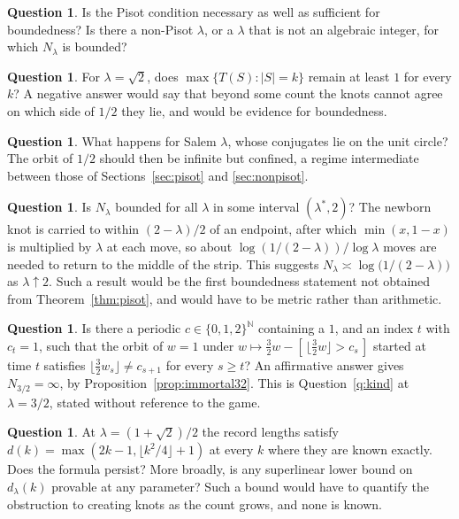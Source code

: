 \documentclass[11pt,reqno]{amsart}
\theoremstyle{plain}
\theoremstyle{definition}
\newtheorem{question}[theorem]{Question}
\theoremstyle{remark}
\begin{document}
\begin{question}
Is the Pisot condition necessary as well as sufficient for boundedness? Is
there a non-Pisot $\lambda$, or a $\lambda$ that is not an algebraic integer,
for which $N_\lambda$ is bounded?
\end{question}

\begin{question}
For $\lambda=\sqrt2$, does $\max\{T(S):|S|=k\}$ remain at least $1$ for every
$k$? A negative answer would say that beyond some count the knots cannot agree
on which side of $1/2$ they lie, and would be evidence for boundedness.
\end{question}

\begin{question}
What happens for Salem $\lambda$, whose conjugates lie on the unit circle? The
orbit of $1/2$ should then be infinite but confined, a regime intermediate
between those of Sections~\ref{sec:pisot} and \ref{sec:nonpisot}.
\end{question}

\begin{question}
Is $N_\lambda$ bounded for all $\lambda$ in some interval $(\lambda^*,2)$? The
newborn knot is carried to within $(2-\lambda)/2$ of an endpoint, after which
$\min(x,1-x)$ is multiplied by $\lambda$ at each move, so about
$\log(1/(2-\lambda))/\log\lambda$ moves are needed to return to the middle of
the strip. This suggests $N_\lambda\asymp\log\bigl(1/(2-\lambda)\bigr)$ as
$\lambda\uparrow2$. Such a result would be the first boundedness statement not
obtained from Theorem~\ref{thm:pisot}, and would have to be metric rather
than arithmetic.
\end{question}

\begin{question}\label{q:mahlerform}
Is there a periodic $c\in\{0,1,2\}^{\mathbb N}$ containing a $1$, and an index
$t$ with $c_t=1$, such that the orbit of $w=1$ under
$w\mapsto\tfrac32w-[\,\lfloor\tfrac32w\rfloor>c_s\,]$ started at time $t$
satisfies $\lfloor\tfrac32w_s\rfloor\neq c_{s+1}$ for every $s\geq t$? An
affirmative answer gives $N_{3/2}=\infty$, by
Proposition~\ref{prop:immortal32}. This is Question~\ref{q:kind} at
$\lambda=3/2$, stated without reference to the game.
\end{question}

\begin{question}
At $\lambda=(1+\sqrt2)/2$ the record lengths satisfy
$d(k)=\max(2k-1,\lfloor k^2/4\rfloor+1)$ at every $k$ where they are known
exactly. Does the formula persist? More broadly, is any superlinear lower bound
on $d_\lambda(k)$ provable at any parameter? Such a bound would have to
quantify the obstruction to creating knots as the count grows, and none is
known.
\end{question}
\end{document}
